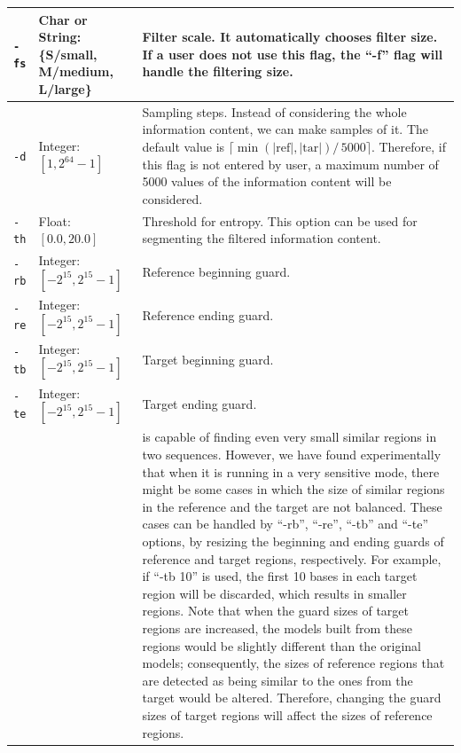 \documentclass[a4paper,9pt]{extarticle}
\newcommand*{\method}[1]{\text{#1}\xspace}
\newcommand*{\smashpp}   {\method{Smash++}}
\newcommand*{\mono}[1]{\lstinline|#1|}
\begin{document}
\begin{small}
\begin{tabularx}{\linewidth}{@{}lp{2.9cm}X@{}}
  \midrule
  \mono{-fs} & Char or String:\newline \{S/small, M/medium, L/large\}
   & Filter scale. It automatically chooses filter size. If a user does not use this flag, the ``-f'' flag will handle the filtering size.  \\
  \midrule
  \mono{-d} & Integer: $[1, 2^{64}-1]$ & Sampling steps. Instead of considering the whole information content, we can make samples of it. The default value is $\lceil\min\left(\lvert\textrm{ref}\rvert, \lvert\textrm{tar}\rvert\right) /\, 5000\rceil$. Therefore, if this flag is not entered by user, a maximum number of 5000 values of the information content will be considered. \\
  \midrule
  \mono{-th} & Float: $[0.0, 20.0]$\newline {}{1.5} & Threshold for entropy. This option can be used for segmenting the filtered information content. \\
  \midrule
  \mono{-rb} & Integer: $[-2^{15}, 2^{15}-1]$ & Reference beginning guard. \\
  \mono{-re} & Integer: $[-2^{15}, 2^{15}-1]$ & Reference ending guard. \\
  \mono{-tb} & Integer: $[-2^{15}, 2^{15}-1]$ & Target beginning guard. \\
  \mono{-te} & Integer: $[-2^{15}, 2^{15}-1]$ & Target ending guard. \\
  & {0} & \smashpp is capable of finding even very small similar regions in two sequences. However, we have found experimentally that when it is running in a very sensitive mode, there might be some cases in which the size of similar regions in the reference and the target are not balanced. These cases can be handled by ``-rb'', ``-re'', ``-tb'' and ``-te'' options, by resizing the beginning and ending guards of reference and target regions, respectively. For example, if ``-tb 10'' is used, the first 10 bases in each target region will be discarded, which results in smaller regions. Note that when the guard sizes of target regions are increased, the models built from these regions would be slightly different than the original models; consequently, the sizes of reference regions that are detected as being similar to the ones from the target would be altered. Therefore, changing the guard sizes of target regions will affect the sizes of reference regions. 

\end{tabularx}
\end{small}
\end{document}
